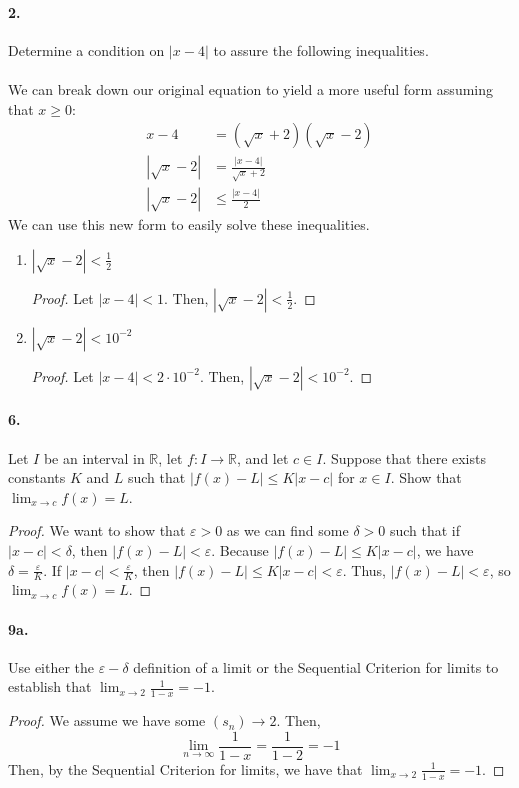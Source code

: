 \documentclass[12pt]{article}
\newcommand\R{\mathbb{R}}
\theoremstyle{remark}
\begin{document}
\paragraph{2.} Determine a condition on $|x - 4|$ to assure the following inequalities. \\\null\\
We can break down our original equation to yield a more useful form assuming that $x \geq 0$:
\begin{align*}
    x - 4 &= (\sqrt{x} + 2)(\sqrt{x} - 2) \\
    |\sqrt{x} - 2| &= \frac{|x - 4|}{\sqrt{x} + 2} \\
    |\sqrt{x} - 2| &\leq \frac{|x - 4|}{2}
\end{align*}
We can use this new form to easily solve these inequalities.
\begin{enumerate}[label=(\alph*)]
    \item $|\sqrt{x} - 2| < \frac{1}{2}$
    \begin{proof}
        Let $|x - 4| < 1$. Then, $|\sqrt{x} - 2| < \frac{1}{2}$.
    \end{proof}

    \item $|\sqrt{x} - 2| < 10^{-2}$
    \begin{proof}
        Let $|x - 4| < 2 \cdot 10^{-2}$. Then, $|\sqrt{x} - 2| < 10^{-2}$.
    \end{proof}
    
\end{enumerate}

\paragraph{6.} Let $I$ be an interval in $\R$, let $f: I \to \R$, and let $c \in I$. Suppose that there exists constants $K$ and $L$ such that $|f(x) - L| \leq K|x - c|$ for $x \in I$. Show that $\lim_{x \to c} f(x) = L$.
\begin{proof}
    We want to show that $\varepsilon > 0$ as we can find some $\delta > 0$ such that if $|x - c| < \delta$, then $|f(x) - L| < \varepsilon$. Because $|f(x) - L| \leq K|x - c|$, we have $\delta = \frac{\varepsilon}{K}$. If $|x - c| < \frac{\varepsilon}{K}$, then $|f(x) - L| \leq K|x - c| < \varepsilon$. Thus, $|f(x) - L| < \varepsilon$, so $\lim_{x \to c} f(x) = L$.
\end{proof}

\paragraph{9a.} Use either the $\varepsilon-\delta$ definition of a limit or the Sequential Criterion for limits to establish that $\lim_{x \to 2} \frac{1}{1 - x} = -1$.
\begin{proof}
    We assume we have some $(s_n) \to 2$. Then, $$\lim_{n \to \infty} \frac{1}{1 - x} = \frac{1}{1 - 2} = -1$$ Then, by the Sequential Criterion for limits, we have that $\lim_{x \to 2} \frac{1}{1 - x} = -1$.
\end{proof}
\end{document}
